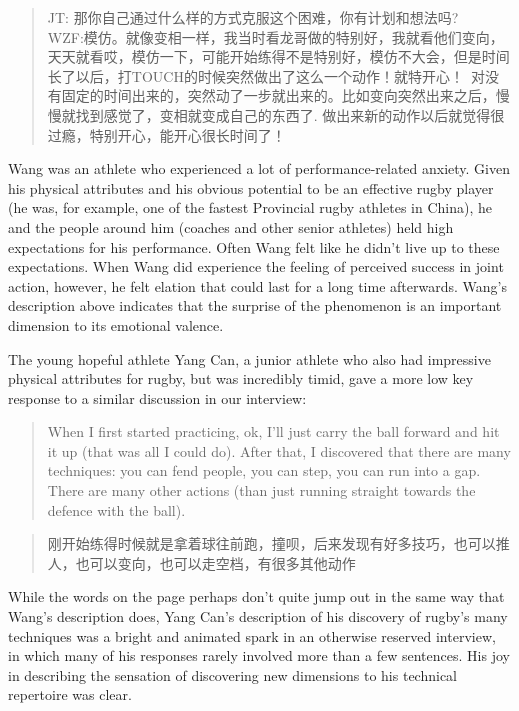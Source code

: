 \begin{CJK}{UTF8}{gbsn}
    \begin{quote}
      JT: 那你自己通过什么样的方式克服这个困难，你有计划和想法吗? \\
      WZF:模仿。就像变相一样，我当时看龙哥做的特别好，我就看他们变向，天天就看哎，模仿一下，可能开始练得不是特别好，模仿不大会，但是时间长了以后，打TOUCH的时候突然做出了这么一个动作！就特开心！ 对没有固定的时间出来的，突然动了一步就出来的。比如变向突然出来之后，慢慢就找到感觉了，变相就变成自己的东西了. 做出来新的动作以后就觉得很过瘾，特别开心，能开心很长时间了！
    \end{quote}

Wang was an athlete who experienced a lot of performance-related anxiety.  Given his physical attributes and his obvious potential to be an effective rugby player (he was, for example, one of the fastest Provincial rugby athletes in China), he and the people around him (coaches and other senior athletes) held high expectations for his performance. Often Wang felt like he didn't live up to these expectations.  When Wang did experience the feeling of perceived success in joint action, however, he felt elation that could last for a long time afterwards.  Wang's description above indicates that the surprise of the phenomenon is an important dimension to its emotional valence.

The young hopeful athlete Yang Can, a junior athlete who also had impressive physical attributes for rugby, but was incredibly timid, gave a more low key response to a similar discussion in our interview:

    \begin{quote}
      When I first started practicing, ok, I’ll just carry the ball forward and hit it up (that was all I could do). After that, I discovered that there are many techniques: you can fend people, you can step, you can run into a gap. There are many other actions (than just running straight towards the defence with the ball).
    \end{quote}

    \begin{quote}
      刚开始练得时候就是拿着球往前跑，撞呗，后来发现有好多技巧，也可以推人，也可以变向，也可以走空档，有很多其他动作 
    \end{quote}

While the words on the page perhaps don't quite jump out in the same way that Wang's description does, Yang Can's description of his discovery of rugby's many techniques was a bright and animated spark in an otherwise reserved interview, in which many of his responses rarely involved more than a few sentences.  His joy in describing the sensation of discovering new dimensions to his technical repertoire was clear.


\end{CJK}
